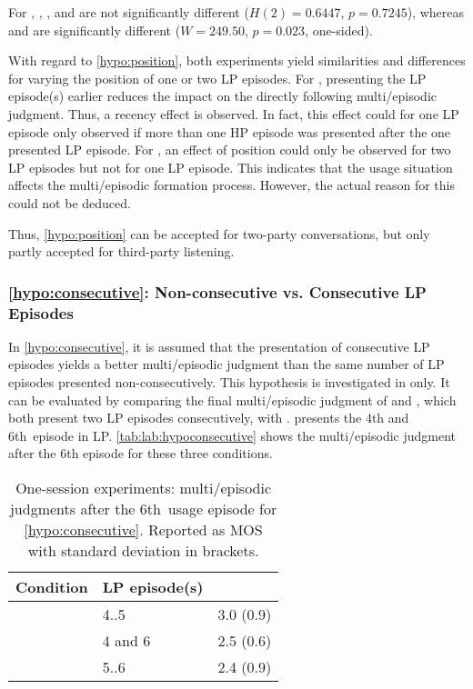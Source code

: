 For \EIIa{}, , \CIIa{}, and  are not significantly different ($H(2)=0.6447$, $p=0.7245$), whereas  and \CVa{} are significantly different ($W=249.50$, $p=0.023$, one-sided).

With regard to \autoref{hypo:position}, both experiments yield similarities and differences for varying the position of one or two \ac{LP} episodes.
For , presenting the \ac{LP} episode(s) earlier reduces the impact on the directly following multi\-/episodic judgment.
Thus, a recency effect is observed.
In fact, this effect could for one \ac{LP} episode only observed if more than one \ac{HP} episode was presented after the one presented \ac{LP} episode.
For \EIIa{}, an effect of position could only be observed for two \ac{LP} episodes but not for one \ac{LP} episode.
This indicates that the usage situation affects the multi\-/episodic formation process.
However, the actual reason for this could not be deduced.

Thus, \autoref{hypo:position} can be accepted for two-party conversations, but only partly accepted for third-party listening.

\subsubsection{\autoref{hypo:consecutive}: Non-consecutive vs. Consecutive \acs{LP} Episodes}
In \autoref{hypo:consecutive}, it is assumed that the presentation of consecutive \ac{LP} episodes yields a better multi\-/episodic judgment than the same number of \ac{LP} episodes presented non-consecutively.
This hypothesis is investigated in \EIIa{} only.
It can be evaluated by comparing the final multi\-/episodic judgment of  and \CVa{}, which both present two \ac{LP} episodes consecutively, with . %
 presents the 4th and 6th~episode in \ac{LP}.
\autoref{tab:lab:hypoconsecutive} shows the multi\-/episodic judgment after the 6th episode for these three conditions.

\begin{table}
 \centering
 \caption[One-session experiments: multi\-/episodic judgments after the 6th~usage episode for \autoref{hypo:consecutive}.]{One-session experiments: multi\-/episodic judgments after the 6th~usage episode for \autoref{hypo:consecutive}. Reported as \ac{MOS} with standard deviation in brackets.}
 \label{tab:lab:hypoconsecutive} 
 \begin{tabularx}{\columnwidth}{Y|Y|Y}
	Condition   & \ac{LP} episode(s) 	& \EIIa{} \\
	\midrule
				& 4..5			& 3.0 (0.9)\\
	\hline
				& 4 and 6	& 2.5 (0.6)\\
	\hline
	\CVa{}			& 5..6			& 2.4 (0.9)\\
 \end{tabularx}
\end{table}

